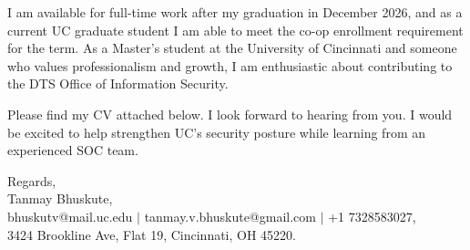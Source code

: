 \documentclass[11pt]{letter}
\begin{document}
\begin{letter}{}
I am available for full-time work after my graduation in December 2026, and as a current UC graduate student I am able to meet the co-op enrollment requirement for the term. As a Master's student at the University of Cincinnati and someone who values professionalism and growth, I am enthusiastic about contributing to the DTS Office of Information Security.

Please find my CV attached below. I look forward to hearing from you. I would be excited to help strengthen UC's security posture while learning from an experienced SOC team.

{\setlength{\parskip}{0pt}
Regards,\\
Tanmay Bhuskute,\\
bhuskutv@mail.uc.edu $\mid$ tanmay.v.bhuskute@gmail.com $\mid$ +1 7328583027,\\
3424 Brookline Ave, Flat 19, Cincinnati, OH 45220.
}

\end{letter}
\end{document}
